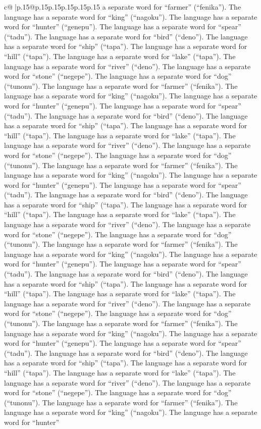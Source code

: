 \documentclass{article}
\begin{document}
{\begin{supertabular}{c@{$\;$}|p{.15\linewidth}@{}p{.15\linewidth}p{.15\linewidth}p{.15\linewidth}p{.15\linewidth}p{.15\linewidth}}
{{{a separate word for “farmer” (“fenika”). The language has a separate word for “king” (“nagoku”). The language has a separate word for “hunter” (“genepu”). The language has a separate word for “spear” (“tadu”). The language has a separate word for “bird” (“deno”). The language has a separate word for “ship” (“tapa”). The language has a separate word for “hill” (“tapa”). The language has a separate word for “lake” (“tapa”). The language has a separate word for “river” (“deno”). The language has a separate word for “stone” (“negepe”). The language has a separate word for “dog” (“tunonu”). The language has a separate word for “farmer” (“fenika”). The language has a separate word for “king” (“nagoku”). The language has a separate word for “hunter” (“genepu”). The language has a separate word for “spear” (“tadu”). The language has a separate word for “bird” (“deno”). The language has a separate word for “ship” (“tapa”). The language has a separate word for “hill” (“tapa”). The language has a separate word for “lake” (“tapa”). The language has a separate word for “river” (“deno”). The language has a separate word for “stone” (“negepe”). The language has a separate word for “dog” (“tunonu”). The language has a separate word for “farmer” (“fenika”). The language has a separate word for “king” (“nagoku”). The language has a separate word for “hunter” (“genepu”). The language has a separate word for “spear” (“tadu”). The language has a separate word for “bird” (“deno”). The language has a separate word for “ship” (“tapa”). The language has a separate word for “hill” (“tapa”). The language has a separate word for “lake” (“tapa”). The language has a separate word for “river” (“deno”). The language has a separate word for “stone” (“negepe”). The language has a separate word for “dog” (“tunonu”). The language has a separate word for “farmer” (“fenika”). The language has a separate word for “king” (“nagoku”). The language has a separate word for “hunter” (“genepu”). The language has a separate word for “spear” (“tadu”). The language has a separate word for “bird” (“deno”). The language has a separate word for “ship” (“tapa”). The language has a separate word for “hill” (“tapa”). The language has a separate word for “lake” (“tapa”). The language has a separate word for “river” (“deno”). The language has a separate word for “stone” (“negepe”). The language has a separate word for “dog” (“tunonu”). The language has a separate word for “farmer” (“fenika”). The language has a separate word for “king” (“nagoku”). The language has a separate word for “hunter” (“genepu”). The language has a separate word for “spear” (“tadu”). The language has a separate word for “bird” (“deno”). The language has a separate word for “ship” (“tapa”). The language has a separate word for “hill” (“tapa”). The language has a separate word for “lake” (“tapa”). The language has a separate word for “river” (“deno”). The language has a separate word for “stone” (“negepe”). The language has a separate word for “dog” (“tunonu”). The language has a separate word for “farmer” (“fenika”). The language has a separate word for “king” (“nagoku”). The language has a separate word for “hunter” }}}
\end{supertabular}}
\end{document}
